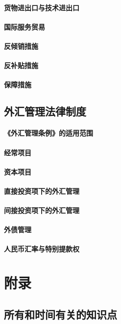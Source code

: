 \documentclass[UTF8,12pt]{ctexart}
\numberwithin{equation}{section} %
\numberwithin{figure}{section}
\numberwithin{table}{section}
\begin{document}
	\paragraph{货物进出口与技术进出口}
	
	\paragraph{国际服务贸易}
	
	\paragraph{反倾销措施}
	
	\paragraph{反补贴措施}
	
	\paragraph{保障措施}
	
	
	\subsection{外汇管理法律制度}
	
	\paragraph{《外汇管理条例》的适用范围}
	
	\paragraph{经常项目}
	
	\paragraph{资本项目}
	
	\paragraph{直接投资项下的外汇管理}
	
	\paragraph{间接投资项下的外汇管理}
	
	\paragraph{外债管理}
	
	\paragraph{人民币汇率与特别提款权}
	 
	
	  
	
	
	\newpage
	\section{附录}
	\subsection{所有和时间有关的知识点}
	
\end{document}
